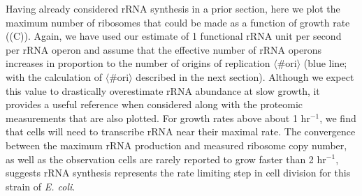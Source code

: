 
Having already considered rRNA synthesis in a prior section, here we  plot the
maximum number of ribosomes that could be made as a function of growth rate
((C)). Again, we have used our estimate of 1 functional rRNA
unit per second per rRNA operon and assume that the effective number of rRNA
operons increases in proportion to the number of origins of replication
$\langle\text{\# ori}\rangle$ (blue line; with the calculation of
$\langle\text{\# ori}\rangle$ described in the next section). Although we expect
this value to drastically overestimate rRNA abundance at slow growth, it
provides a useful reference when considered along with the  proteomic
measurements that are also plotted. For growth rates above about 1 hr$^{-1}$, we
find that cells will need to transcribe rRNA near their maximal rate. The
convergence between the maximum rRNA production and measured ribosome copy
number, as well as the observation cells are rarely reported to grow faster than
2 hr$^{-1}$, suggests rRNA synthesis represents the rate limiting step in cell
division for this strain of \textit{E. coli}.
